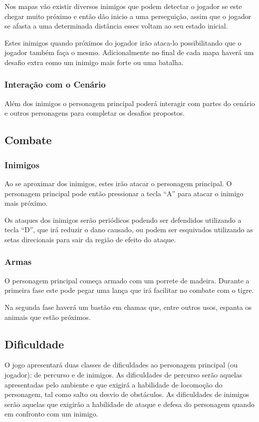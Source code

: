 Nos mapas vão existir diversos inimigos que podem detectar o jogador se 
este chegar muito próximo 
e então dão inicio a uma perseguição, assim que o jogador se afasta a 
uma determinada distância esses voltam ao seu estado inicial. 

Estes inimigos quando próximos do jogador irão ataca-lo possibilitando que o 
jogador também faça o mesmo. 
Adicionalmente no final de cada mapa haverá um desafio extra como um inimigo
 mais forte ou uma batalha.  

\subsubsection {Interação com o Cenário}

Além dos inimigos o personagem principal poderá interagir com partes do
 cenário e outros personagens para completar os
desafios propostos.

\subsection {Combate}
\subsubsection{Inimigos}
Ao se aproximar dos inimigos, estes irão atacar o personagem principal. O
 personagem principal pode então pressionar a tecla ``A'' para atacar o
 inimigo mais próximo.

Os ataques dos inimigos serão periódicos podendo ser defendidos utilizando a
 tecla ``D'', que irá reduzir o dano causado, ou podem ser esquivados
 utilizando as 
setas direcionais para sair da região de efeito do ataque.

\subsubsection {Armas}
O personagem principal começa armado com um porrete de madeira. Durante a
 primeira fase este pode pegar uma lança que irá facilitar no combate com o
 tigre. 

Na segunda fase haverá um bastão em chamas que, entre outros usos, espanta
 os animais que estão próximos.

\subsection {Dificuldade}

O jogo apresentará duas classes de dificuldades ao personagem principal (ou jogador): de percurso e de
inimigos. As dificuldades de percurso serão aquelas apresentadas pelo ambiente e que exigirá a habilidade
de locomoção do personagem, tal como salto ou desvio de obstáculos. As dificuldades de inimigos serão
aquelas que exigirão a habilidade de ataque e defesa do personagem quando em confronto com um inimigo.

